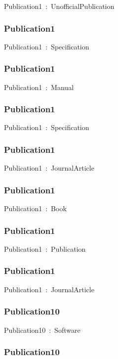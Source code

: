 \documentclass{article}
\begin{document}
Publication1~:~UnofficialPublication

\subsubsection*{Publication1}

Publication1~:~Specification

\subsubsection*{Publication1}

Publication1~:~Manual

\subsubsection*{Publication1}

Publication1~:~Specification

\subsubsection*{Publication1}

Publication1~:~JournalArticle

\subsubsection*{Publication1}

Publication1~:~Book

\subsubsection*{Publication1}

Publication1~:~Publication

\subsubsection*{Publication1}

Publication1~:~JournalArticle

\subsubsection*{Publication10}

Publication10~:~Software

\subsubsection*{Publication10}
\end{document}
